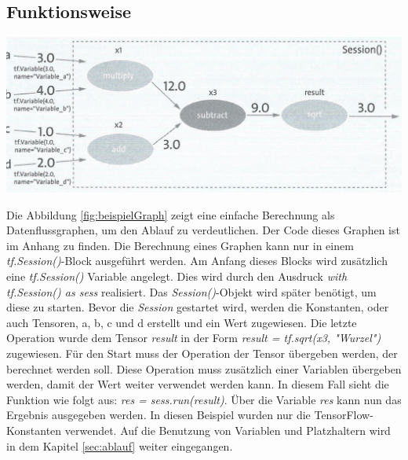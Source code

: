 \subsection{Funktionsweise}
\label{sec:graphenFunktionsweise}
\begin{center}
\includegraphics[width=.6\textwidth]{../abbildungen/5-11.pdf}
	\label{fig:beispielGraph}
\end{center}
Die Abbildung \ref{fig:beispielGraph} zeigt eine einfache Berechnung als Datenflussgraphen, um den Ablauf zu verdeutlichen. Der Code dieses Graphen ist im Anhang zu finden. Die Berechnung eines Graphen kann nur in einem \textit{tf.Session()}-Block ausgeführt werden. Am Anfang dieses Blocks wird zusätzlich eine \textit{tf.Session()} Variable angelegt. Dies wird durch den Ausdruck \textit{with tf.Session() as sess} realisiert. Das \textit{Session()}-Objekt wird später benötigt, um diese zu starten. Bevor die \textit{Session} gestartet wird, werden die Konstanten, oder auch Tensoren, a, b, c und d erstellt und ein Wert zugewiesen. Die letzte Operation wurde dem Tensor \textit{result} in der Form \textit{result = tf.sqrt(x3, "Wurzel")} zugewiesen. Für den Start muss der Operation der Tensor übergeben werden, der berechnet werden soll. Diese Operation muss zusätzlich einer Variablen übergeben werden, damit der Wert weiter verwendet werden kann. In diesem Fall sieht die Funktion wie folgt aus: \textit{res = sess.run(result)}. Über die Variable \textit{res} kann nun das Ergebnis ausgegeben werden. In diesen Beispiel wurden nur die TensorFlow-Konstanten verwendet. Auf die Benutzung von Variablen und Platzhaltern wird in dem Kapitel \ref{sec:ablauf} weiter eingegangen.

